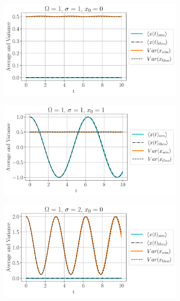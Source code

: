 \begin{figure}[h!]
     \begin{subfigure}[h]{1\textwidth}
         \centering
         \includegraphics[width=\textwidth]{plot/Omega1_sigma1_x00_Averages.pdf}
         \caption{}
         
     \end{subfigure}
     \begin{subfigure}[h]{1\textwidth}
         \centering
         \includegraphics[width=\textwidth]{plot/Omega1_sigma1_x01_Averages.pdf}
         \caption{}
         
     \end{subfigure}
     \begin{subfigure}[h]{0.65\textwidth}
         \centering
         \includegraphics[width=\textwidth]{plot/Omega1_sigma2_x00_Averages.pdf}
         \caption{}
         

\end{subfigure}
\end{figure}
